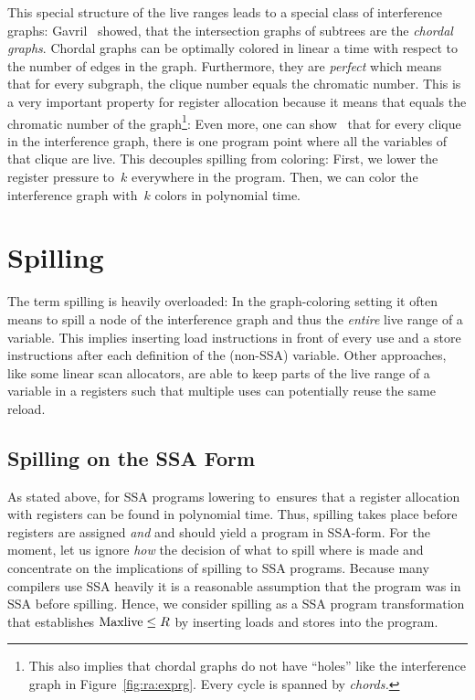 {This special structure of the live ranges leads to a special class of interference graphs:
Gavril~\cite{gavril:1974:trees} showed, that the intersection graphs of subtrees are the \emph{chordal graphs}.
Chordal graphs can be optimally colored in linear a time with respect to the number of edges in the graph.
Furthermore, they are \emph{perfect} which means that for every subgraph, the clique number equals the chromatic number. 
This is a very important property for register allocation because it means that \maxlive equals the chromatic number of the graph\footnote{
This also implies that chordal graphs do not have ``holes'' like the interference graph in Figure~\ref{fig:ra:exprg}.
Every cycle is spanned by \emph{chords.}
}:
Even more, one can show~\cite{bouchez,HGG:2006:RA_SSA} that for every clique in the interference graph, there is one program point where all the variables of that clique are live.
This decouples spilling from coloring:
First, we lower the register pressure to~$k$ everywhere in the program.
Then, we can color the interference graph with~$k$ colors in polynomial time.


\section{Spilling}

The term spilling is heavily overloaded:
In the graph-coloring setting it often means to spill a node of the interference graph and thus the \emph{entire} live range of a variable.
This implies inserting load instructions in front of every use and a store instructions after each definition of the (non-SSA) variable.
Other approaches, like some linear scan allocators, are able to keep parts of the live range of a variable in a registers such that multiple uses can potentially reuse the same reload.

\subsection{Spilling on the SSA Form}

As stated above, for SSA programs lowering \maxlive to~\regs ensures that a register allocation with \regs registers can be found in polynomial time.
Thus, spilling takes place before registers are assigned \emph{and} and should yield a program in SSA-form.
For the moment, let us ignore \emph{how} the decision of what to spill where is made and concentrate on the implications of spilling to SSA programs.
Because many compilers use SSA heavily it is a reasonable assumption that the program was in SSA before spilling.
Hence, we consider spilling as a SSA program transformation that establishes $\mathrm{Maxlive}\le R$ by inserting loads and stores into the program.

}
